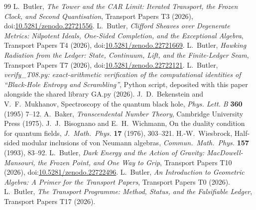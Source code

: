 \documentclass[11pt]{article}
\theoremstyle{definition}
\theoremstyle{plain}
\begin{document}
\begin{thebibliography}{99}
 L.~Butler,
\emph{The Tower and the CAR Limit: Iterated Transport, the Frozen Clock, and Second Quantisation},
Transport Papers T3 (2026), doi:\href{https://doi.org/10.5281/zenodo.22721556}{10.5281/zenodo.22721556}.
 L.~Butler,
\emph{Clifford Sheaves over Degenerate Metrics: Nilpotent Ideals, One-Sided Completion, and the Exceptional Algebra},
Transport Papers T4 (2026), doi:\href{https://doi.org/10.5281/zenodo.22721669}{10.5281/zenodo.22721669}.
 L.~Butler,
\emph{Hawking Radiation from the Ledger: State, Continuum, Lift, and the Finite-Ledger Seam},
Transport Papers T7 (2026), doi:\href{https://doi.org/10.5281/zenodo.22722121}{10.5281/zenodo.22722121}.
 L.~Butler,
\emph{verify\_T08.py: exact-arithmetic verification of the computational identities of ``Black-Hole Entropy and Scrambling''},
Python script, deposited with this paper alongside the shared library GA.py (2026).
 J.~D.~Bekenstein and V.~F.~Mukhanov,
Spectroscopy of the quantum black hole,
\emph{Phys. Lett. B} \textbf{360} (1995) 7--12.
 A.~Baker,
\emph{Transcendental Number Theory},
Cambridge University Press (1975).
 J.~J.~Bisognano and E.~H.~Wichmann,
On the duality condition for quantum fields,
\emph{J.\ Math.\ Phys.} \textbf{17} (1976), 303--321.
 H.-W.~Wiesbrock,
Half-sided modular inclusions of von Neumann algebras,
\emph{Commun.\ Math.\ Phys.} \textbf{157} (1993), 83--92.
 L.~Butler,
\emph{Dark Energy and the Action of Gravity: MacDowell-Mansouri, the Frozen Point, and One Way to Grip},
Transport Papers T10 (2026), doi:\href{https://doi.org/10.5281/zenodo.22722496}{10.5281/zenodo.22722496}.
 L.~Butler,
\emph{An Introduction to Geometric Algebra: A Primer for the Transport Papers},
Transport Papers T0 (2026).
 L.~Butler,
\emph{The Transport Programme: Method, Status, and the Falsifiable Ledger},
Transport Papers T17 (2026).
\end{thebibliography}
\end{document}
